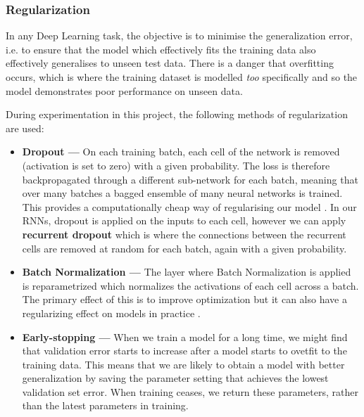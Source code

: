 \documentclass[12pt,a4paper]{article}
\begin{document}
	\subsubsection{Regularization}
	In any Deep Learning task, the objective is to minimise the generalization error, i.e. to ensure that the model which effectively fits the training data also effectively generalises to unseen test data. There is a danger that overfitting occurs, which is where the training dataset is modelled \textit{too} specifically and so the model demonstrates poor performance on unseen data. 
	
	During experimentation in this project, the following methods of regularization are used:
	\begin{itemize}
		\item \textbf{Dropout --- }On each training batch, each cell of the network is removed (activation is set to zero) with a given probability. The loss is therefore backpropagated through a different sub-network for each batch, meaning that over many batches a bagged ensemble of many neural networks is trained. This provides a computationally cheap way of regularising our model \cite[p.273]{DL}. In our RNNs, dropout is applied on the inputs to each cell, however we can apply \textbf{recurrent dropout} which is where the connections between the recurrent cells are removed at random for each batch, again with a given probability.
		\item \textbf{Batch Normalization --- }The layer where Batch Normalization is applied is reparametrized which normalizes the activations of each cell across a batch. The primary effect of this is to improve optimization but it can also have a regularizing effect on models in practice \cite[p.1]{Sergey}. 
		\item \textbf{Early-stopping --- }When we train a model for a long time, we might find that validation error starts to increase after a model starts to ovetfit to the training data. This means that we are likely to obtain a model with better generalization by saving the parameter setting that achieves the lowest validation set error. When training ceases, we return these parameters, rather than the latest parameters in training.
	\end{itemize}
\end{document}
